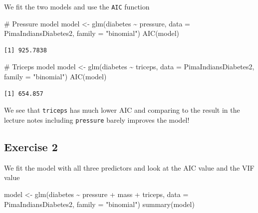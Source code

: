 \documentclass[
  letterpaper,
  DIV=11,
  numbers=noendperiod]{scrreprt}
\newenvironment{Shaded}{\begin{snugshade}}{\end{snugshade}}
\newcommand{\AttributeTok}[1]{\textcolor[rgb]{0.40,0.45,0.13}{#1}}
\newcommand{\CommentTok}[1]{\textcolor[rgb]{0.37,0.37,0.37}{#1}}
\newcommand{\FunctionTok}[1]{\textcolor[rgb]{0.28,0.35,0.67}{#1}}
\newcommand{\NormalTok}[1]{\textcolor[rgb]{0.00,0.23,0.31}{#1}}
\newcommand{\OtherTok}[1]{\textcolor[rgb]{0.00,0.23,0.31}{#1}}
\newcommand{\SpecialCharTok}[1]{\textcolor[rgb]{0.37,0.37,0.37}{#1}}
\newcommand{\StringTok}[1]{\textcolor[rgb]{0.13,0.47,0.30}{#1}}
\begin{document}
We fit the two models and use the \texttt{AIC} function

\begin{Shaded}
\begin{Highlighting}[]
\CommentTok{\# Pressure model}
\NormalTok{model }\OtherTok{\textless{}{-}} \FunctionTok{glm}\NormalTok{(diabetes }\SpecialCharTok{\textasciitilde{}}\NormalTok{ pressure, }\AttributeTok{data =}\NormalTok{ PimaIndiansDiabetes2, }\AttributeTok{family =} \StringTok{"binomial"}\NormalTok{)}
\FunctionTok{AIC}\NormalTok{(model)}
\end{Highlighting}
\end{Shaded}

\begin{verbatim}
[1] 925.7838
\end{verbatim}

\begin{Shaded}
\begin{Highlighting}[]
\CommentTok{\# Triceps model}
\NormalTok{model }\OtherTok{\textless{}{-}} \FunctionTok{glm}\NormalTok{(diabetes }\SpecialCharTok{\textasciitilde{}}\NormalTok{ triceps, }\AttributeTok{data =}\NormalTok{ PimaIndiansDiabetes2, }\AttributeTok{family =} \StringTok{"binomial"}\NormalTok{)}
\FunctionTok{AIC}\NormalTok{(model)}
\end{Highlighting}
\end{Shaded}

\begin{verbatim}
[1] 654.857
\end{verbatim}

We see that \texttt{triceps} has much lower AIC and comparing to the
result in the lecture notes including \texttt{pressure} barely improves
the model!

\subsection{Exercise 2}\label{exercise-2-32}

We fit the model with all three predictors and look at the AIC value and
the VIF value

\begin{Shaded}
\begin{Highlighting}[]
\NormalTok{model }\OtherTok{\textless{}{-}} \FunctionTok{glm}\NormalTok{(diabetes }\SpecialCharTok{\textasciitilde{}}\NormalTok{ pressure }\SpecialCharTok{+}\NormalTok{ mass }\SpecialCharTok{+}\NormalTok{ triceps, }\AttributeTok{data =}\NormalTok{ PimaIndiansDiabetes2, }\AttributeTok{family =} \StringTok{"binomial"}\NormalTok{)}
\FunctionTok{summary}\NormalTok{(model)}
\end{Highlighting}
\end{Shaded}
\end{document}
